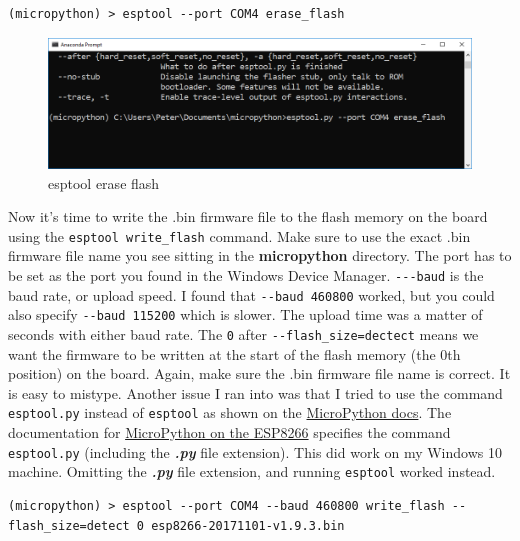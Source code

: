 \documentclass{book}
\makeatletter
\def\maxwidth{\ifdim\Gin@nat@width>\linewidth\linewidth
    \else\Gin@nat@width\fi}
\let\Oldincludegraphics\includegraphics
\renewcommand{\includegraphics}[1]{\Oldincludegraphics[width=.8\maxwidth]{#1}}
\makeatother
\begin{document}
\begin{lstlisting}
(micropython) > esptool --port COM4 erase_flash
\end{lstlisting}

\begin{figure}
\centering
\includegraphics{images/esptool_erase_flash.PNG}
\caption{esptool erase flash}
\end{figure}

Now it's time to write the .bin firmware file to the flash memory on the
board using the \lstinline!esptool write_flash! command. Make sure to
use the exact .bin firmware file name you see sitting in the
\textbf{micropython} directory. The port has to be set as the port you
found in the Windows Device Manager. \lstinline!---baud! is the baud
rate, or upload speed. I found that \lstinline!--baud 460800! worked,
but you could also specify \lstinline!--baud 115200! which is slower.
The upload time was a matter of seconds with either baud rate. The
\lstinline!0! after \lstinline!--flash_size=dectect! means we want the
firmware to be written at the start of the flash memory (the 0th
position) on the board. Again, make sure the .bin firmware file name is
correct. It is easy to mistype. Another issue I ran into was that I
tried to use the command \lstinline!esptool.py! instead of
\lstinline!esptool! as shown on the
\href{https://docs.micropython.org/en/latest/esp8266/esp8266/tutorial/intro.html\#deploying-the-firmware}{MicroPython
docs}. The documentation for
\href{https://docs.micropython.org/en/latest/esp8266/esp8266/tutorial/intro.html\#deploying-the-firmware}{MicroPython
on the ESP8266} specifies the command \lstinline!esptool.py! (including
the \textbf{\emph{.py}} file extension). This did work on my Windows 10
machine. Omitting the \textbf{\emph{.py}} file extension, and running
\lstinline!esptool! worked instead.

\begin{lstlisting}
(micropython) > esptool --port COM4 --baud 460800 write_flash --flash_size=detect 0 esp8266-20171101-v1.9.3.bin
\end{lstlisting}
\end{document}
